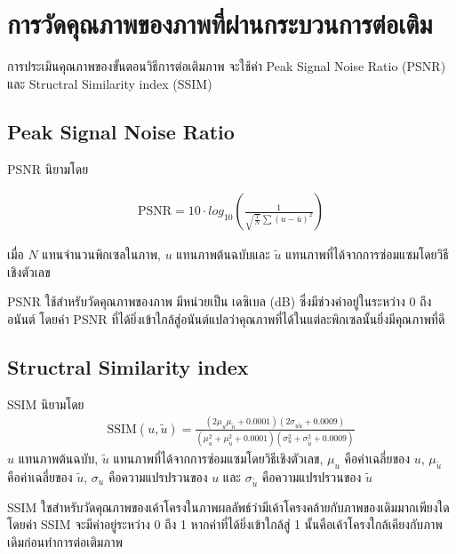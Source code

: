 \section{การวัดคุณภาพของภาพที่ผ่านกระบวนการต่อเติม}

\hspace{1cm} การประเมินคุณภาพของขั้นตอนวิธีการต่อเติมภาพ จะใช้ค่า Peak Signal Noise Ratio (PSNR) \cite{ref:PSNR} และ Structral Similarity index (SSIM) \cite{ref:SSIM} 

\subsection{Peak Signal Noise Ratio}

\hspace{1cm} PSNR นิยามโดย

\begin{align}
	\text{PSNR}  = 10 \cdot log_{10} ( \frac{1}{\sqrt{\frac{1}{N}} \sum (u - \bar{u})^2})
\end{align}

เมื่อ $N$ แทนจำนวนพิกเซลในภาพ, $u$ แทนภาพต้นฉบับและ $\tilde{u}$ แทนภาพที่ได้จากการซ่อมแซมโดยวิธีเชิงตัวเลข

\hspace{1cm} PSNR ใช้สำหรับวัดคุณภาพของภาพ มีหน่วยเป็น เดซิเบล (dB) ซึ่งมีช่วงค่าอยู่ในระหว่าง 0 ถึง อนันต์ โดยค่า PSNR ที่ได้ยิ่งเข้าใกล้สู่อนันต์แปลว่าคุณภาพที่ได้ในแต่ละพิกเซลนั้นยิ่งมีคุณภาพที่ดี

\subsection{Structral Similarity index}
\hspace{1cm} SSIM นิยามโดย
\begin{align*}
	\text{SSIM}(u,\tilde{u}) = \frac{(2\mu_u\mu_{\tilde{u}} + 0.0001)(2\sigma_{u\tilde{u}} + 0.0009)}{(\mu_u^2+\mu_{\tilde{u}}^2+0.0001)(\sigma_u^2+\sigma_{\tilde{u}}^2+0.0009)}
\end{align*}
$u$ แทนภาพต้นฉบับ, $\tilde{u}$ แทนภาพที่ได้จากการซ่อมแซมโดยวิธีเชิงตัวเลข,  $\mu_u$ คือค่าเฉลี่ยของ $u$, $\mu_{\tilde{u}}$ คือค่าเฉลี่ยของ $\tilde{u}$, $\sigma_u$ คือความแปรปรวนของ $u$ และ $\sigma_{\tilde{u}}$ คือความแปรปรวนของ $\tilde{u}$

\hspace{1cm} SSIM ใชสำหรับวัดคุณภาพของเค้าโครงในภาพผลลัพธ์ว่ามีเค้าโครงคล้ายกับภาพของเดิมมากเพียงใด โดยค่า SSIM จะมีค่าอยู่ระหว่าง 0 ถึง 1 หากค่าที่ได้ยิ่งเข้าใกล้สู่ 1 นั้นคือเค้าโครงใกล้เคียงกับภาพเดิมก่อนทำการต่อเติมภาพ